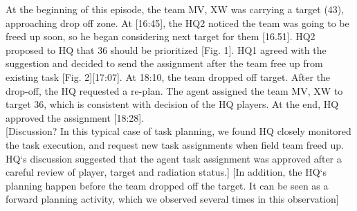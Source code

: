 \noindent{} 
\hfill \break

At the beginning of this episode, the team MV, XW was carrying a target (43), approaching drop off zone. At [16:45], the HQ2 noticed the team was going to be freed up soon, so he began considering next target for them [16.51]. HQ2 proposed to HQ that 36 should be prioritized [Fig. 1]. HQ1 agreed with the suggestion and decided to send the assignment after the team free up from existing task [Fig. 2][17:07]. At 18:10, the team dropped off target. After the drop-off, the HQ requested a re-plan. The agent assigned the team MV, XW to target 36, which is consistent with decision of the HQ players. At the end, HQ approved the assignment [18:28].\\

[Discussion? In this typical case of task planning, we found HQ closely monitored the task execution, and request new task assignments when field team freed up. HQ`s discussion suggested that the agent task assignment was approved after a careful review of player, target and radiation status.] [In addition, the HQ`s planning happen before the team dropped off the target. It can be seen as a forward planning activity, which we observed several times in this observation]\\

